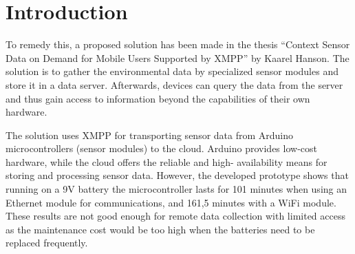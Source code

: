 


\chapter{Introduction}

\ifpdf
    \graphicspath{{1_introduction/figures/PNG/}{1_introduction/figures/PDF/}{1_introduction/figures/}}
\else
    \graphicspath{{1_introduction/figures/EPS/}{1_introduction/figures/}}
\fi





To remedy this, a proposed solution has been made in the thesis “Context Sensor Data on
Demand for Mobile Users Supported by XMPP” by Kaarel Hanson. The solution is to gather the environmental data by specialized sensor modules and store it in a data server. Afterwards, devices can query the data from the server and thus gain access to information beyond the capabilities of their own hardware.

The solution uses XMPP for transporting sensor data from Arduino microcontrollers (sensor modules) to the cloud. Arduino provides low-cost hardware, while the cloud offers the reliable and high-
availability means for storing and processing sensor data. However, the developed prototype shows that running on a 9V battery the microcontroller lasts for 101
minutes when using an Ethernet module for communications, and 161,5 minutes with a
WiFi module. These results are not good enough for remote data collection with limited access as the maintenance cost would be too high when the batteries need to be replaced frequently. 

